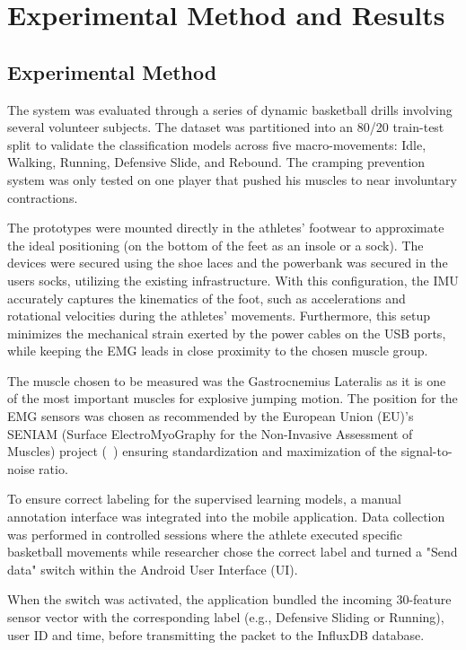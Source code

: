 \documentclass[conference]{IEEEtran}
\begin{document}
\section{Experimental Method and Results}
\label{results}

\subsection{Experimental Method}
The system was evaluated through a series of dynamic basketball drills involving several volunteer subjects. The dataset was partitioned into an 80/20 train-test split to 
validate the classification models across five macro-movements: Idle, Walking, Running, Defensive Slide, and Rebound. The cramping prevention system
was only tested on one player that pushed his muscles to near involuntary contractions.

The prototypes were mounted directly in the athletes' footwear to approximate the ideal
positioning (on the bottom of the feet as an insole or a sock). The devices were secured using
the shoe laces and the powerbank was secured in the users socks, utilizing the existing
infrastructure. With this configuration, the IMU accurately captures the kinematics of
the foot, such as accelerations and rotational velocities during the athletes' movements.
Furthermore, this setup minimizes the mechanical strain exerted by the power cables on
the USB ports, while keeping the EMG leads in close proximity to the chosen muscle
group. 

The muscle chosen to be measured was the Gastrocnemius Lateralis as it is one of the most important muscles for explosive jumping motion. The position for the EMG
sensors was chosen as recommended by the European Union (EU)'s SENIAM (Surface ElectroMyoGraphy for the Non-Invasive Assessment of Muscles) project (~\cite{b7}) ensuring standardization and maximization of the 
signal-to-noise ratio.

To ensure correct labeling for the supervised learning models, a manual annotation interface was integrated into the mobile application. Data collection was performed in controlled sessions where the 
athlete executed specific basketball movements while researcher chose the correct label and turned a "Send data" switch within the Android User Interface (UI).

When the switch was activated, the application bundled the incoming 30-feature sensor vector with the corresponding label (e.g., Defensive Sliding or Running), user ID and time, before transmitting the packet to the 
InfluxDB database.
\end{document}
